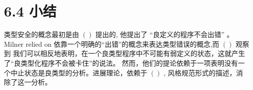 \section{6.4 小结}

类型安全的概念最初是由 $()$ 提出的, 他提出了 ``良定义的程序不会出错'' 。Milner relied on 依靠一个明确的“出错”的概念来表达类型错误的概念,而 $()$ 观察到
我们可以相反地表明，在一个良类型程序中不可能有弱定义的状态，这就产生了“良类型化程序不会被卡住”的说法。
然而，他们的提论依赖于一项表明没有一个中止状态是良类型的分析。进展理论，依赖于 $()$ , 风格规范形式的描述，消除了这一分析。
